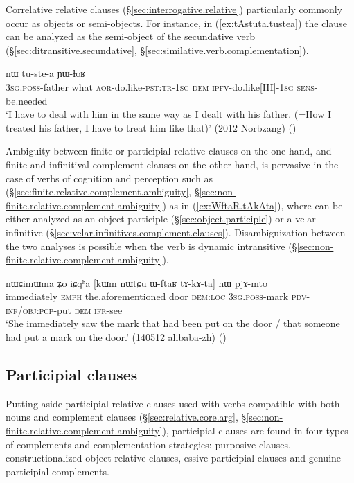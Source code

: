 Correlative relative clauses (§\ref{sec:interrogative.relative}) particularly commonly occur as objects or semi-objects. For instance, in (\ref{ex:tAstuta.tustea}) the clause  can be analyzed as the semi-object of the secundative verb  (§\ref{sec:ditransitive.secundative}, §\ref{sec:similative.verb.complementation}).

\begin{exe}
	\ex \label{ex:tAstuta.tustea}
	 nɯ tu-ste-a ɲɯ-ɬoʁ \\
	\textsc{3sg}.\textsc{poss}-father what \textsc{aor}-do.like-\textsc{pst}:\textsc{tr}-\textsc{1sg} \textsc{dem} \textsc{ipfv}-do.like[III]-\textsc{1sg} \textsc{sens}-be.needed \\
	\glt `I have to deal with him in the same way as I dealt with his father. (=How I treated his father, I have to treat him like that)' (2012 Norbzang)
()
\end{exe}

Ambiguity between finite or participial relative clauses on the one hand, and finite and infinitival complement clauses on the other hand, is pervasive in the case of verbs of cognition and perception such as  (§\ref{sec:finite.relative.complement.ambiguity}, §\ref{sec:non-finite.relative.complement.ambiguity}) as in (\ref{ex:WftaR.tAkAta}), where  can be either analyzed as an object participle (§\ref{sec:object.participle}) or a velar infinitive (§\ref{sec:velar.infinitives.complement.clauses}). Disambiguization between the two analyses is possible when the verb is dynamic intransitive (§\ref{sec:non-finite.relative.complement.ambiguity}).

\begin{exe}
	\ex  \label{ex:WftaR.tAkAta}
	\gll nɯɕimɯma ʑo iɕqʰa [kɯm nɯtɕu ɯ-ftaʁ tɤ-kɤ-ta] nɯ pjɤ-mto \\
	immediately \textsc{emph} the.aforementioned door \textsc{dem}:\textsc{loc} \textsc{3sg}.\textsc{poss}-mark \textsc{pdv}-\textsc{inf}/\textsc{obj}:\textsc{pcp}-put \textsc{dem} \textsc{ifr}-see \\
	\glt `She immediately saw the mark that had been put on the door / that someone had put a mark on the door.' (140512 alibaba-zh)
()
\end{exe}

\subsection{Participial clauses} \label{sec:participial.clause.complementation strategies}
Putting aside participial relative clauses used with verbs compatible with both nouns and complement clauses (§\ref{sec:relative.core.arg}, §\ref{sec:non-finite.relative.complement.ambiguity}), participial clauses are found in four types of complements and complementation strategies: purposive clauses, constructionalized object relative clauses, essive participial clauses and genuine participial complements.

